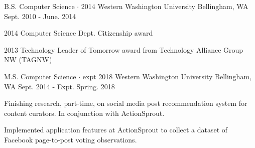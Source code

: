 \documentclass[11pt, a4paper]{awesome-cv}
\begin{document}
\begin{cventries}
  \cventry
  {B.S. Computer Science $\cdot$ 2014} %
  {Western Washington University} %
  {Bellingham, WA} %
  {Sept. 2010 - June. 2014} %
  {
  \begin{cvitems} %
    \item {2014 Computer Science Dept. Citizenship award}
    \item {2013 Technology Leader of Tomorrow award from Technology Alliance Group NW (TAGNW)}
  \end{cvitems}
  }
  {}

  \cventry
  {M.S. Computer Science $\cdot$ expt 2018} %
  {Western Washington University} %
  {Bellingham, WA} %
  {Sept. 2014 - Expt. Spring. 2018} %
  {
  \begin{cvitems} %
    \item {Finishing research, part-time, on social media post recommendation system for content curators. In conjunction with ActionSprout.}
    \item {Implemented application features at ActionSprout to collect a dataset of Facebook page-to-post voting observations.}
  \end{cvitems}
  }
  {}

\end{cventries}
\end{document}
